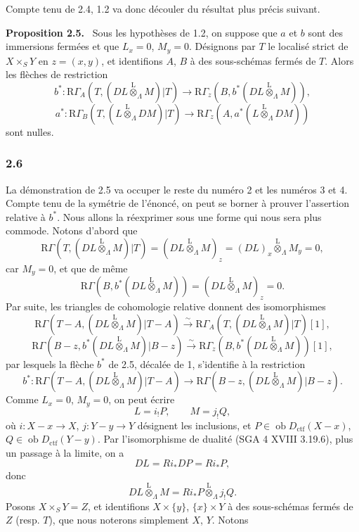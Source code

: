 \documentclass[11pt]{article}
\newenvironment{statement}[1]{\par\medskip\noindent\textbf{#1.}\ }{\par\medskip}
\providecommand{\lten}{\overset{\mathrm L}{\otimes}}
\providecommand{\Ob}{\operatorname{ob}}
\providecommand{\lten}{\overset{\mathrm L}{\otimes}}
\providecommand{\lten}{\overset{\mathrm L}{\otimes}}
\providecommand{\Ob}{\operatorname{ob}}
\providecommand{\lten}{\overset{\mathrm L}{\otimes}}
\providecommand{\lten}{\overset{\mathrm L}{\otimes}}
\providecommand{\Ob}{\operatorname{Ob}}
\providecommand{\lten}{\overset{\mathrm L}{\otimes}}
\providecommand{\Ob}{\operatorname{ob}}
\providecommand{\Ob}{\operatorname{Ob}}
\providecommand{\lten}{\overset{\mathrm L}{\otimes}}
\begin{document}
Compte tenu de 2.4, 1.2 va donc découler du résultat plus précis suivant.

\begin{statement}{Proposition 2.5}
Sous les hypothèses de 1.2, on suppose que $a$ et $b$ sont des immersions fermées et que $L_x=0$, $M_y=0$. Désignons par $T$ le localisé strict de $X\times_SY$ en $z=(x,y)$, et identifions $A$, $B$ à des sous-schémas fermés de $T$. Alors les flèches de restriction
\[
b^*:\mathrm R\Gamma_A(T,(DL\lten_{\Lambda}M)|T)
 \longrightarrow \mathrm R\Gamma_z(B,b^*(DL\lten_{\Lambda}M)),
\]
\[
a^*:\mathrm R\Gamma_B(T,(L\lten_{\Lambda}DM)|T)
 \longrightarrow \mathrm R\Gamma_z(A,a^*(L\lten_{\Lambda}DM))
\]
sont nulles.
\end{statement}

\subsubsection*{2.6}
La démonstration de 2.5 va occuper le reste du numéro 2 et les numéros 3 et 4. Compte tenu de la symétrie de l'énoncé, on peut se borner à prouver l'assertion relative à $b^*$. Nous allons la réexprimer sous une forme qui nous sera plus commode. Notons d'abord que
\[
\mathrm R\Gamma(T,(DL\lten_{\Lambda}M)|T)
 =(DL\lten_{\Lambda}M)_z
 =(DL)_x\lten_{\Lambda}M_y=0,
\]
car $M_y=0$, et que de même
\[
\mathrm R\Gamma(B,b^*(DL\lten_{\Lambda}M))
 =(DL\lten_{\Lambda}M)_z=0.
\]
Par suite, les triangles de cohomologie relative donnent des isomorphismes
\[
\mathrm R\Gamma(T-A,(DL\lten_{\Lambda}M)|T-A)
 \xrightarrow{\sim}
\mathrm R\Gamma_A(T,(DL\lten_{\Lambda}M)|T)[1],
\]
\[
\mathrm R\Gamma(B-z,b^*(DL\lten_{\Lambda}M)|B-z)
 \xrightarrow{\sim}
\mathrm R\Gamma_z(B,b^*(DL\lten_{\Lambda}M))[1],
\]
par lesquels la flèche $b^*$ de 2.5, décalée de 1, s'identifie à la restriction
\begin{equation}
b^*:\mathrm R\Gamma(T-A,(DL\lten_{\Lambda}M)|T-A)
 \longrightarrow \mathrm R\Gamma(B-z,(DL\lten_{\Lambda}M)|B-z).
\tag{2.6.1}
\end{equation}
Comme $L_x=0$, $M_y=0$, on peut écrire
\begin{equation}
L=i_!P,\qquad M=j_!Q,
\tag{2.6.2}
\end{equation}
où $i:X-x\to X$, $j:Y-y\to Y$ désignent les inclusions, et $P\in\Ob D_{\mathrm{ctf}}(X-x)$, $Q\in\Ob D_{\mathrm{ctf}}(Y-y)$. Par l'isomorphisme de dualité (SGA 4 XVIII 3.19.6), plus un passage à la limite, on a
\[
DL=Ri_*DP=Ri_*P,
\]
donc
\[
DL\lten_{\Lambda}M=Ri_*P\lten_{\Lambda}j_!Q.
\]
Posons $X\times_SY=Z$, et identifions $X\times\{y\}$, $\{x\}\times Y$ à des sous-schémas fermés de $Z$ (resp. $T$), que nous noterons simplement $X$, $Y$. Notons
\end{document}
